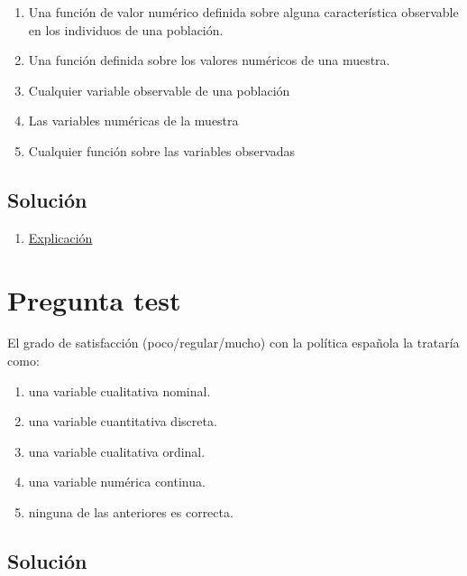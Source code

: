 \documentclass[
]{book}
\providecommand{\tightlist}{%
  \setlength{\itemsep}{0pt}\setlength{\parskip}{0pt}}
\begin{document}
\begin{enumerate}
\def\labelenumi{\alph{enumi})}
\tightlist
\item
  Una función de valor numérico definida sobre alguna característica observable en los individuos de una población.
\item
  Una función definida sobre los valores numéricos de una muestra.
\item
  Cualquier variable observable de una población
\item
  Las variables numéricas de la muestra
\item
  Cualquier función sobre las variables observadas
\end{enumerate}

\hypertarget{soluciuxf3n-13}{%
\subsection{Solución}\label{soluciuxf3n-13}}

\begin{enumerate}
\def\labelenumi{\alph{enumi})}
\tightlist
\item
  \href{https://1fjmanzano.github.io/bioestadistica/conceptos-previos.html}{Explicación}
\end{enumerate}

\hypertarget{pregunta-test-12}{%
\section{Pregunta test}\label{pregunta-test-12}}

El grado de satisfacción (poco/regular/mucho) con la política española la trataría como:

\begin{enumerate}
\def\labelenumi{\alph{enumi})}
\tightlist
\item
  una variable cualitativa nominal.
\item
  una variable cuantitativa discreta.
\item
  una variable cualitativa ordinal.
\item
  una variable numérica continua.
\item
  ninguna de las anteriores es correcta.
\end{enumerate}

\hypertarget{soluciuxf3n-14}{%
\subsection{Solución}\label{soluciuxf3n-14}}
\end{document}
